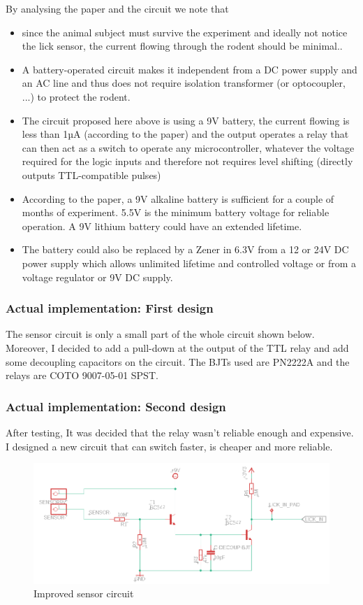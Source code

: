 \documentclass[a4paper]{article}
\begin{document}
By analysing the paper and the circuit we note that
\begin{itemize}
    \item since the animal subject must survive the experiment and ideally not notice the lick sensor, the current flowing through the rodent should be minimal..
    \item A battery-operated circuit makes it independent from a DC power supply and an AC line and thus does not require isolation transformer (or optocoupler, ...) to protect the rodent.
    \item The circuit proposed here above is using a 9V battery, the current flowing is less than 1µA (according to the paper) and the output operates a relay that can then act as a switch to operate any microcontroller, whatever the voltage required for the logic inputs and therefore not requires level shifting (directly outputs TTL-compatible pulses)
    \item According to the paper, a 9V alkaline battery is sufficient for a couple of months of experiment. 5.5V is the minimum battery voltage for reliable operation. A 9V lithium battery could have an extended lifetime.
    \item The battery could also be replaced by a Zener in 6.3V from a 12 or 24V DC power supply which allows unlimited lifetime and controlled voltage or from a voltage regulator or 9V DC supply.
\end{itemize}

\subsubsection{Actual implementation: First design}
The sensor circuit is only a small part of the whole circuit shown below. Moreover, I decided to add a pull-down at the output of the TTL relay and add some decoupling capacitors on the circuit.
The BJTs used are PN2222A and the relays are COTO 9007-05-01 SPST.

\subsubsection{Actual implementation: Second design}
After testing, It was decided that the relay wasn't reliable enough and expensive.
I designed a new circuit that can switch faster, is cheaper and more reliable.

\begin{figure}[h!]
    \centering
    \includegraphics[width = 10 cm]{images/sensorv3.png}
    \caption{Improved sensor circuit}
    \label{fig:sensorv3}
\end{figure}
\end{document}

